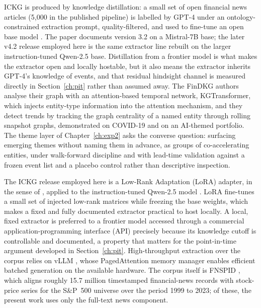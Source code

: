 \documentclass[a4paper,12pt]{report}
\begin{document}
ICKG is produced by
knowledge distillation: a small set of open financial news articles
(5{,}000 in the published pipeline) is labelled by GPT-4 under an
ontology-constrained extraction prompt, quality-filtered, and used to
fine-tune an open base model \citep{Li2024FinDKG}. The paper documents
version 3.2 on a Mistral-7B base; the later v4.2 release employed here
is the same extractor line rebuilt on the larger instruction-tuned
Qwen-2.5 base. Distillation from a frontier model is what makes the
extractor open and locally hostable, but it also means the extractor
inherits GPT-4's knowledge of events, and that residual hindsight
channel is measured directly in Section~\ref{ch:pit} rather than assumed
away.
The FinDKG authors analyse
their graph with an attention-based temporal network, KGTransformer,
which injects entity-type information into the attention mechanism, and
they detect trends by tracking the graph centrality of a named
entity through rolling snapshot graphs, demonstrated on COVID-19 and on
an AI-themed portfolio. The theme layer of Chapter~\ref{ch:exp2} asks
the converse question: surfacing emerging themes without naming
them in advance, as groups of co-accelerating entities, under
walk-forward discipline and with lead-time validation against a frozen
event list and a placebo control rather than descriptive inspection.

The
ICKG release employed here is a Low-Rank Adaptation (LoRA) adapter, in the sense
of \citet{Hu2022LoRA}, applied to the instruction-tuned Qwen-2.5 model
\citep{Qwen2024}. LoRA fine-tunes a small set of injected low-rank matrices while
freezing the base weights, which makes a fixed and fully documented extractor
practical to host locally. A local, fixed extractor is preferred to a frontier
model accessed through a commercial application-programming interface (API)
precisely because its knowledge cutoff is controllable and documented, a property
that matters for the point-in-time argument developed in Section~\ref{ch:pit}.
High-throughput extraction over the corpus relies on vLLM \citep{Kwon2023vLLM},
whose PagedAttention memory manager enables efficient batched generation on the
available hardware. The corpus itself is FNSPID \citep{Dong2024FNSPID}, which
aligns roughly 15.7 million timestamped financial-news records with stock-price
series for the S\&P~500 universe over the period 1999 to 2023; of these, the
present work uses only the full-text news component.
\end{document}
